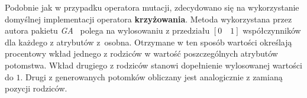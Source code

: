 \par
Podobnie jak w przypadku operatora mutacji, zdecydowano się na wykorzystanie domyślnej implementacji operatora \textbf{krzyżowania}. Metoda wykorzystana przez autora pakietu \emph{GA}~\cite{gaPackage} polega na wylosowaniu z przedziału $[0\quad1]$ współczynników dla każdego z atrybutów z~osobna. Otrzymane w ten sposób wartości określają procentowy wkład jednego z rodziców w wartość poszczególnych atrybutów potomstwa. Wkład drugiego z rodziców stanowi dopełnienie wylosowanej wartości do $1$. Drugi z generowanych potomków obliczany jest analogicznie z zamianą pozycji rodziców. 

